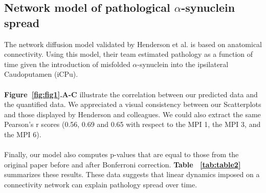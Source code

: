 \subsection{Network model of pathological $\alpha$-synuclein spread}
The network diffusion model validated by Henderson et al. is based on anatomical connectivity. Using this model, their team estimated pathology as a function of time given the introduction of misfolded $\alpha$-synuclein into the ipsilateral Caudoputamen (iCPu).\\
\\
\textbf{Figure~\ref{fig:fig1}.A-C} illustrate the correlation between our predicted data and the quantified data. We appreciated a visual consistency between our Scatterplots and those displayed by Henderson and colleagues. We could also extract the same Pearson's r scores (0.56, 0.69 and 0.65 with respect to the MPI 1, the MPI 3, and the MPI 6).\\
\\
Finally, our model also computes p-values that are equal to those from the original paper before and after Bonferroni correction. \textbf{Table ~\ref{tab:table2}} summarizes these results.
These data suggests that linear dynamics imposed on a connectivity network can explain pathology spread over time.\\

